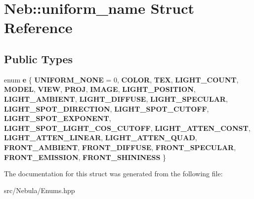 \hypertarget{structNeb_1_1uniform__name}{\section{\-Neb\-:\-:uniform\-\_\-name \-Struct \-Reference}
\label{structNeb_1_1uniform__name}
}
\subsection*{\-Public \-Types}
\begin{DoxyCompactItemize}
\item 
enum {\bfseries e} \{ \*
{\bfseries \-U\-N\-I\-F\-O\-R\-M\-\_\-\-N\-O\-N\-E} =  0, 
{\bfseries \-C\-O\-L\-O\-R}, 
{\bfseries \-T\-E\-X}, 
{\bfseries \-L\-I\-G\-H\-T\-\_\-\-C\-O\-U\-N\-T}, 
\*
{\bfseries \-M\-O\-D\-E\-L}, 
{\bfseries \-V\-I\-E\-W}, 
{\bfseries \-P\-R\-O\-J}, 
{\bfseries \-I\-M\-A\-G\-E}, 
\*
{\bfseries \-L\-I\-G\-H\-T\-\_\-\-P\-O\-S\-I\-T\-I\-O\-N}, 
{\bfseries \-L\-I\-G\-H\-T\-\_\-\-A\-M\-B\-I\-E\-N\-T}, 
{\bfseries \-L\-I\-G\-H\-T\-\_\-\-D\-I\-F\-F\-U\-S\-E}, 
{\bfseries \-L\-I\-G\-H\-T\-\_\-\-S\-P\-E\-C\-U\-L\-A\-R}, 
\*
{\bfseries \-L\-I\-G\-H\-T\-\_\-\-S\-P\-O\-T\-\_\-\-D\-I\-R\-E\-C\-T\-I\-O\-N}, 
{\bfseries \-L\-I\-G\-H\-T\-\_\-\-S\-P\-O\-T\-\_\-\-C\-U\-T\-O\-F\-F}, 
{\bfseries \-L\-I\-G\-H\-T\-\_\-\-S\-P\-O\-T\-\_\-\-E\-X\-P\-O\-N\-E\-N\-T}, 
{\bfseries \-L\-I\-G\-H\-T\-\_\-\-S\-P\-O\-T\-\_\-\-L\-I\-G\-H\-T\-\_\-\-C\-O\-S\-\_\-\-C\-U\-T\-O\-F\-F}, 
\*
{\bfseries \-L\-I\-G\-H\-T\-\_\-\-A\-T\-T\-E\-N\-\_\-\-C\-O\-N\-S\-T}, 
{\bfseries \-L\-I\-G\-H\-T\-\_\-\-A\-T\-T\-E\-N\-\_\-\-L\-I\-N\-E\-A\-R}, 
{\bfseries \-L\-I\-G\-H\-T\-\_\-\-A\-T\-T\-E\-N\-\_\-\-Q\-U\-A\-D}, 
{\bfseries \-F\-R\-O\-N\-T\-\_\-\-A\-M\-B\-I\-E\-N\-T}, 
\*
{\bfseries \-F\-R\-O\-N\-T\-\_\-\-D\-I\-F\-F\-U\-S\-E}, 
{\bfseries \-F\-R\-O\-N\-T\-\_\-\-S\-P\-E\-C\-U\-L\-A\-R}, 
{\bfseries \-F\-R\-O\-N\-T\-\_\-\-E\-M\-I\-S\-S\-I\-O\-N}, 
{\bfseries \-F\-R\-O\-N\-T\-\_\-\-S\-H\-I\-N\-I\-N\-E\-S\-S}
 \}
\end{DoxyCompactItemize}


\-The documentation for this struct was generated from the following file\-:\begin{DoxyCompactItemize}
\item 
src/\-Nebula/\-Enums.\-hpp\end{DoxyCompactItemize}
